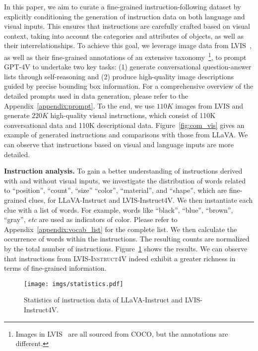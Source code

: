 \documentclass{article}
\makeatletter
\newcommand{\fakeparagraph}[1]{\vspace{3mm}\noindent\textbf{#1}}
\newcommand{\dataname}{\textsc{LVIS-Instruct4V}\xspace}
\newcommand*{\etc}{\emph{etc}\@\xspace}
\makeatother
\begin{document}
In this paper, we aim to curate a fine-grained instruction-following dataset by explicitly conditioning the generation of instruction data on both language and visual inputs. This ensures that instructions are carefully crafted based on visual context, taking into account the categories and attributes of objects, as well as their interrelationships. To achieve this goal, we leverage image data from LVIS~\cite{gupta2019lvis}, as well as their fine-grained annotations of an extensive taxonomy~\footnote{Images in LVIS~\cite{gupta2019lvis} are all sourced from COCO, but the annotations are different.}, to prompt GPT-4V to undertake two key tasks: (1) generate conversational question-answer lists through self-reasoning and (2) produce high-quality image descriptions guided by precise bounding box information. For a comprehensive overview of the detailed prompts used in data generation, please refer to the Appendix~\ref{appendix:prompt}. To the end, we use $110K$ images from LVIS and generate $220K$ high-quality visual instructions, which consist of 110K conversational data and 110K descriptional data. Figure~\ref{fig:com_vis} gives an example of generated instructions and comparisons with those from LLaVA. We can observe that instructions based on visual and language inputs are more detailed.

\fakeparagraph{Instruction analysis.} To gain a better understanding of instructions derived with and without visual inputs, we investigate the distribution of words related to ``position'', ``count'', ``size'' ``color'', ``material'', and ``shape'', which are fine-grained clues, for LLaVA-Instruct and LVIS-Instruct4V. We then instantiate each clue with a list of words. For example, words like ``black'', ``blue'', ``brown'', ``gray'', \etc are used as indicators of color. Please refer to Appendix~\ref{appendix:vocab_list} for the complete list. We then
calculate the occurrence of words within the instructions. The resulting counts are normalized by the total number of instructions. Figure~\ref{fig:instruct_analysis} shows the results. We can observe that instructions from \dataname indeed exhibit a greater richness in terms of fine-grained information.



\begin{figure}[!h]
  \centering
  \texttt{[image: imgs/statistics.pdf]}
  \vspace{-0.1in}
  \caption{Statistics of instruction data of LLaVA-Instruct and  LVIS-Instruct4V.}
  \label{fig:instruct_analysis}
\end{figure}
\end{document}
